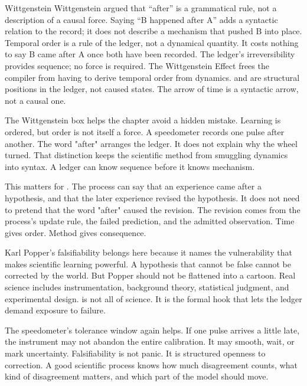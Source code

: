 \begin{gphenom}{Wittgenstein}
\label{ph:wittgenstein}
\GPhObs Wittgenstein argued that ``after'' is a grammatical rule, not a
description of a causal force. Saying ``B happened after A'' adds a syntactic
relation to the record; it does not describe a mechanism that pushed B into
place.
\GPhCon Temporal order is a rule of the ledger, not a dynamical quantity. It
costs nothing to say B came after A once both have been recorded. The ledger's
irreversibility provides sequence; no force is required.
\GPhSeq The Wittgenstein Effect frees the compiler from having to derive
temporal order from dynamics.  and  are structural
positions in the ledger, not caused states. The arrow of time is a syntactic
arrow, not a causal one.
\end{gphenom}

The Wittgenstein box helps the chapter avoid a hidden mistake. Learning is
ordered, but order is not itself a force. A speedometer records one pulse after
another. The word "after" arranges the ledger. It does not explain why the
wheel turned. That distinction keeps the scientific method from smuggling
dynamics into syntax. A ledger can know sequence before it knows mechanism.

This matters for . The process can say that an experience
came after a hypothesis, and that the later experience revised the hypothesis.
It does not need to pretend that the word "after" caused the revision. The
revision comes from the process's update rule, the failed prediction, and the
admitted observation. Time gives order. Method gives consequence.

Karl Popper's falsifiability belongs here because it names the vulnerability
that makes scientific learning powerful. A hypothesis that cannot be false
cannot be corrected by the world. But Popper should not be flattened into a
cartoon. Real science includes instrumentation, background theory, statistical
judgment, and experimental design.  is not all of science.
It is the formal hook that lets the ledger demand exposure to failure.

The speedometer's tolerance window again helps. If one pulse arrives a little
late, the instrument may not abandon the entire calibration. It may smooth,
wait, or mark uncertainty. Falsifiability is not panic. It is structured
openness to correction. A good scientific process knows how much disagreement
counts, what kind of disagreement matters, and which part of the model should
move.

